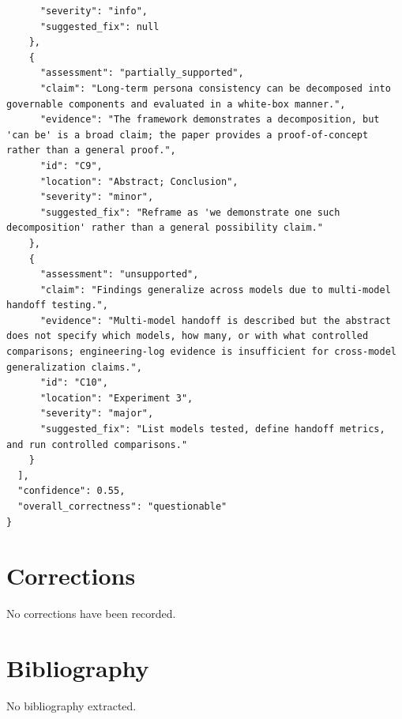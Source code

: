 \documentclass[11pt]{article}
\begin{document}
\begin{verbatim}
      "severity": "info",
      "suggested_fix": null
    },
    {
      "assessment": "partially_supported",
      "claim": "Long-term persona consistency can be decomposed into governable components and evaluated in a white-box manner.",
      "evidence": "The framework demonstrates a decomposition, but 'can be' is a broad claim; the paper provides a proof-of-concept rather than a general proof.",
      "id": "C9",
      "location": "Abstract; Conclusion",
      "severity": "minor",
      "suggested_fix": "Reframe as 'we demonstrate one such decomposition' rather than a general possibility claim."
    },
    {
      "assessment": "unsupported",
      "claim": "Findings generalize across models due to multi-model handoff testing.",
      "evidence": "Multi-model handoff is described but the abstract does not specify which models, how many, or with what controlled comparisons; engineering-log evidence is insufficient for cross-model generalization claims.",
      "id": "C10",
      "location": "Experiment 3",
      "severity": "major",
      "suggested_fix": "List models tested, define handoff metrics, and run controlled comparisons."
    }
  ],
  "confidence": 0.55,
  "overall_correctness": "questionable"
}
\end{verbatim}

\section*{Corrections}
No corrections have been recorded.

\section*{Bibliography}
No bibliography extracted.

% 
% 
\end{document}

